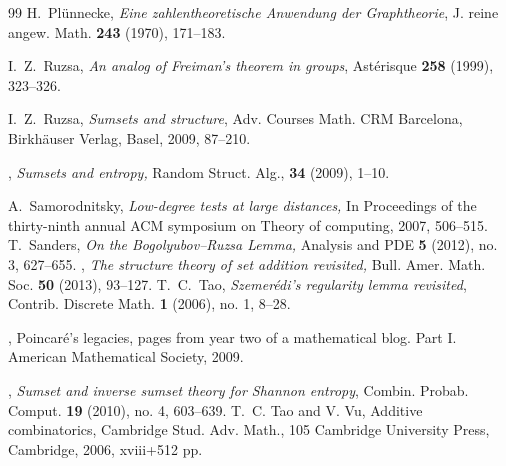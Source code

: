 \documentclass[12pt,reqno,tbtags]{amsart}
\theoremstyle{definition}
\theoremstyle{remark}
\numberwithin{equation}{section}
\begin{document}
\begin{thebibliography}{99}
H.~Pl\"unnecke, \emph{Eine zahlentheoretische Anwendung der Graphtheorie}, J. reine angew. Math. \textbf{243} (1970), 171--183.

   I.~Z.~Ruzsa, \emph{An analog of Freiman’s theorem in groups}, Ast\'erisque \textbf{258} (1999), 323--326.

   I.~Z.~Ruzsa, \emph{Sumsets and structure}, Adv. Courses Math. CRM Barcelona, Birkh\"auser Verlag, Basel, 2009, 87--210.

   \bysame, \emph{Sumsets and entropy,} Random Struct. Alg., \textbf{34} (2009), 1--10.


   A.~Samorodnitsky, \emph{Low-degree tests at large distances,} In Proceedings of the thirty-ninth annual ACM symposium on Theory of computing, 2007, 506--515.
   T.~Sanders, \emph{On the Bogolyubov–Ruzsa Lemma,} Analysis and PDE \textbf{5} (2012), no. 3, 627--655.
   \bysame, \emph{The structure theory of set addition revisited,} Bull. Amer. Math. Soc. \textbf{50} (2013), 93--127.
T.~C.~Tao, \emph{Szemer\'edi's regularity lemma revisited}, Contrib. Discrete Math. \textbf{1} (2006), no. 1, 8--28.

\bysame, Poincar\'e's legacies, pages from year two of a mathematical blog. Part I. American Mathematical Society, 2009.


   \bysame, \emph{Sumset and inverse sumset theory for Shannon entropy}, Combin. Probab. Comput. \textbf{19} (2010), no. 4, 603--639.
T.~C. Tao and V. Vu, Additive combinatorics, Cambridge Stud. Adv. Math., 105
Cambridge University Press, Cambridge, 2006, xviii+512 pp.

\end{thebibliography}
\end{document}
